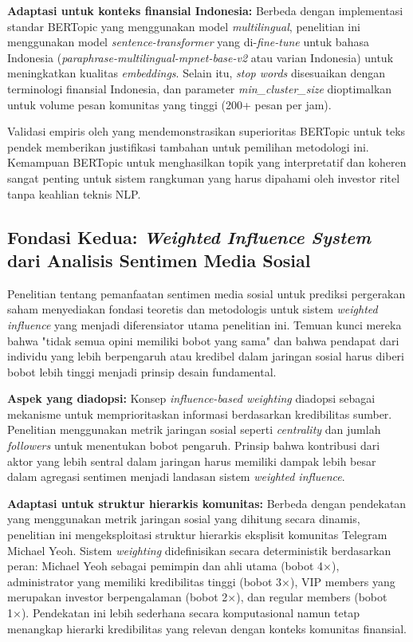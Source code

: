 \textbf{Adaptasi untuk konteks finansial Indonesia:} Berbeda dengan implementasi standar BERTopic yang menggunakan model \textit{multilingual}, penelitian ini menggunakan model \textit{sentence-transformer} yang di-\textit{fine-tune} untuk bahasa Indonesia (\textit{paraphrase-multilingual-mpnet-base-v2} atau varian Indonesia) untuk meningkatkan kualitas \textit{embeddings}. Selain itu, \textit{stop words} disesuaikan dengan terminologi finansial Indonesia, dan parameter \textit{min\_cluster\_size} dioptimalkan untuk volume pesan komunitas yang tinggi (200+ pesan per jam).

Validasi empiris oleh \textcite{egger2022} yang mendemonstrasikan superioritas BERTopic untuk teks pendek memberikan justifikasi tambahan untuk pemilihan metodologi ini. Kemampuan BERTopic untuk menghasilkan topik yang interpretatif dan koheren sangat penting untuk sistem rangkuman yang harus dipahami oleh investor ritel tanpa keahlian teknis NLP.

\subsection{Fondasi Kedua: \textit{Weighted Influence System} dari Analisis Sentimen Media Sosial}

Penelitian \textcite{si2014} tentang pemanfaatan sentimen media sosial untuk prediksi pergerakan saham menyediakan fondasi teoretis dan metodologis untuk sistem \textit{weighted influence} yang menjadi diferensiator utama penelitian ini. Temuan kunci mereka bahwa "tidak semua opini memiliki bobot yang sama" dan bahwa pendapat dari individu yang lebih berpengaruh atau kredibel dalam jaringan sosial harus diberi bobot lebih tinggi menjadi prinsip desain fundamental.

\textbf{Aspek yang diadopsi:} Konsep \textit{influence-based weighting} diadopsi sebagai mekanisme untuk memprioritaskan informasi berdasarkan kredibilitas sumber. Penelitian \textcite{si2014} menggunakan metrik jaringan sosial seperti \textit{centrality} dan jumlah \textit{followers} untuk menentukan bobot pengaruh. Prinsip bahwa kontribusi dari aktor yang lebih sentral dalam jaringan harus memiliki dampak lebih besar dalam agregasi sentimen menjadi landasan sistem \textit{weighted influence}.

\textbf{Adaptasi untuk struktur hierarkis komunitas:} Berbeda dengan pendekatan \textcite{si2014} yang menggunakan metrik jaringan sosial yang dihitung secara dinamis, penelitian ini mengeksploitasi struktur hierarkis eksplisit komunitas Telegram Michael Yeoh. Sistem \textit{weighting} didefinisikan secara deterministik berdasarkan peran: Michael Yeoh sebagai pemimpin dan ahli utama (bobot 4×), administrator yang memiliki kredibilitas tinggi (bobot 3×), VIP members yang merupakan investor berpengalaman (bobot 2×), dan regular members (bobot 1×). Pendekatan ini lebih sederhana secara komputasional namun tetap menangkap hierarki kredibilitas yang relevan dengan konteks komunitas finansial.

